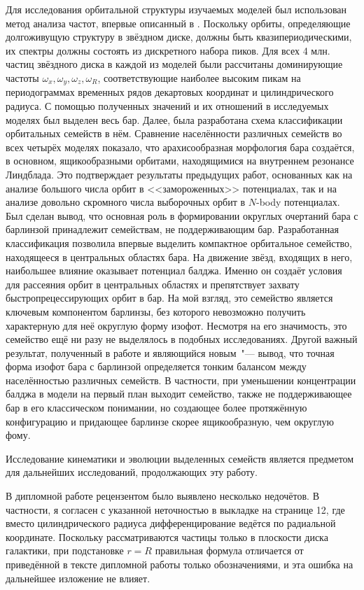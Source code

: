 \documentclass{trlnotes}
\let\citet\cite
\begin{document}
Для исследования орбитальной структуры изучаемых моделей был использован метод анализа частот, впервые описанный в \citet{binney1982}.
Поскольку орбиты, определяющие долгоживущую структуру в звёздном диске, должны быть квазипериодическими, их спектры должны состоять из
дискретного набора пиков. Для всех 4 млн. частиц звёздного диска в каждой из моделей были рассчитаны доминирующие частоты
$ω_x, ω_y, ω_z, ω_R$,  соответствующие наиболее высоким пикам на периодограммах временных рядов декартовых координат и цилиндрического радиуса. 
С помощью полученных значений и их отношений в исследуемых моделях был выделен весь бар. 
Далее, была разработана схема классификации орбитальных семейств в нём.
Сравнение населённости различных семейств во всех четырёх моделях показало, что арахисообразная морфология бара создаётся, в 
основном, ящикообразными орбитами, находящимися на внутреннем резонансе Линдблада. Это подтверждает результаты предыдущих работ, основанных как на анализе большого числа орбит в <<замороженных>> потенциалах, так и на анализе довольно скромного числа выборочных орбит в $N$-body потенциалах. 
Был сделан вывод, что основная роль в формировании округлых очертаний бара с барлинзой принадлежит семействам, не поддерживающим бар. 
Разработанная классификация позволила впервые выделить компактное орбитальное семейство, находящееся в центральных областях бара. 
На движение звёзд, входящих в него, наибольшее влияние оказывает потенциал балджа. 
Именно он создаёт условия для рассеяния орбит в центральных областях и препятствует захвату быстропрецессирующих орбит в бар.
На мой взгляд, это семейство является ключевым компонентом барлинзы, без которого невозможно получить характерную для неё округлую форму изофот.
Несмотря на его значимость, это семейство ещё ни разу не выделялось в подобных исследованиях.
Другой важный результат, полученный в работе и являющийся новым~"--- вывод, что точная форма изофот бара с барлинзой определяется тонким балансом между
населённостью различных семейств. В частности, при уменьшении концентрации балджа в модели на первый план выходит семейство, также не поддерживающее бар в его классическом понимании, но создающее более протяжённую конфигурацию и придающее барлинзе скорее ящикообразную, чем округлую фому. 

Исследование кинематики и эволюции выделенных семейств является предметом для дальнейших исследований, продолжающих эту работу.

\newpage
В дипломной работе рецензентом было выявлено несколько недочётов.
В частности, я согласен с указанной неточностью в выкладке на странице 12, где вместо цилиндрического радиуса 
дифференцирование ведётся по радиальной координате. Поскольку рассматриваются частицы только в плоскости диска
галактики, при подстановке $r=R$ правильная формула отличается от приведённой в тексте дипломной работы только
обозначениями, и эта ошибка на дальнейшее изложение не влияет.
\end{document}
